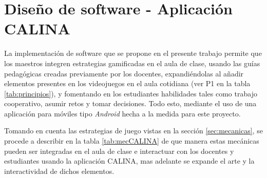\newcommand{\cardHxHBack}[1]{
	\fill[rounded corners=.55cm] (0, 0) rectangle (7.41cm, 10.41cm) {};
	\draw[pattern color=mydarkgray,pattern=fivepointed stars,rounded corners=.55cm] (0, 0) rectangle (7.41cm, 10.41cm) {};
	\fill[white] (0.505cm, 3.3cm) rectangle (6.905cm, 9.7cm) {};
	\node[inner sep=0] at (3.705cm,6.5cm) (QR) {
		\qrcode[height=6cm,nolink]{#1}
	};
	\node[rounded corners=.15cm,fill=mygray, minimum width=3cm, minimum height=1cm] at (1.97cm,2.3cm) {\faPlayCircle\ Usar};
	\node[rounded corners=.15cm,fill=mygray, minimum width=3cm, minimum height=1cm] at (5.44cm,2.3cm) {\faAslInterpreting\ Vender};
	\node[rounded corners=.15cm,fill=mygray, minimum width=3cm, minimum height=1cm] at (1.97cm,1cm) {\faGift\ Regalar};
	\node[rounded corners=.15cm,fill=mygray, minimum width=3cm, minimum height=1cm] at (5.44cm,1cm) {\faTimesCircle\ Destruir};
}

\section{Diseño de software - Aplicación CALINA}

La implementación de software que se propone en el presente trabajo permite que los maestros integren 
estrategias gamificadas en el aula de clase, usando las guías pedagógicas creadas previamente por los 
docentes, expandiéndolas al añadir elementos presentes en los videojuegos en el aula cotidiana (ver P1 en la 
tabla \ref{tab:principios}), y fomentando en los estudiantes habilidades tales como trabajo cooperativo, 
asumir retos y tomar decisiones. Todo esto, mediante el uso de una aplicación para móviles tipo 
\textit{Android} hecha a la medida para este proyecto.

Tomando en cuenta las estrategias de juego vistas en la sección \ref{sec:mecanicas}, se procede a describir en 
la tabla \ref{tab:mecCALINA} de que manera estas mecánicas pueden ser integradas en el aula de clase e 
interactuar con los docentes y estudiantes usando la aplicación CALINA, mas adelante se expande el arte y la 
interactividad de dichos elementos.

